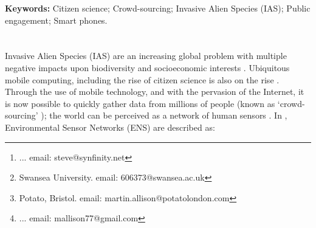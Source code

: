 \documentclass[10pt,psfig,letterpaper,twocolumn]{article}
\begin{document}
% 
%


\title{}
\author{
{}\thanks{... email: steve@synfinity.net }, \and
{}\thanks{Swansea University. email: 606373@swansea.ac.uk}, \and 
{}\thanks{Potato, Bristol. email: martin.allison@potatolondon.com}, \and
{}\thanks{... email: mallison77@gmail.com}\\
}
\date{}
\maketitle
\thispagestyle{empty}
\begin{abstract}
Invasive Alien Species (IAS) are a growing global problem, reducing biodiversity and causing significant negative socioeconomic impacts. Management and control is hampered by a lack of accessible data of adequate spatial and temporal resolution. Smart phone technology and cheap access to data networks may enable crowd-sourcing of IAS data to bridge the `data gap'. By engaging the general public in `citizen science', IAS-ESS (iAssess) aims to provide much-needed, real-time data to scientists.
\end{abstract}
{\bf Keywords:}
Citizen science; Crowd-sourcing; Invasive Alien Species (IAS);  Public engagement; Smart phones.
\section*{}

Invasive Alien Species (IAS) are an increasing global problem with multiple negative impacts upon biodiversity and socioeconomic interests \cite{Vila:2011ft, Vitousek:1997p78}. Ubiquitous mobile computing, including the rise of  citizen science is also on the rise \cite{Silvertown:2009tw}. Through the use of mobile technology, and with the pervasion of the Internet, it is now possible to quickly gather data from millions of people (known as `crowd-sourcing' \cite{Wired:2011uj}); the world can be perceived as a network of human sensors \cite{Goodchild:2007vt}. In \citet{Hart:2006uz}, Environmental Sensor Networks (ENS) are described as:
\end{document}
